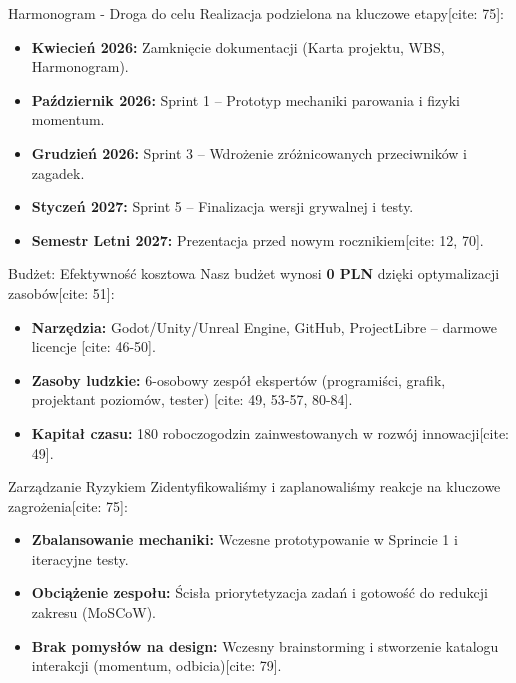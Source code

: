 \documentclass[10pt]{beamer}
\begin{document}
\begin{frame}{Harmonogram - Droga do celu}
    Realizacja podzielona na kluczowe etapy[cite: 75]:
    \begin{itemize}
        \item \textbf{Kwiecień 2026:} Zamknięcie dokumentacji (Karta projektu, WBS, Harmonogram).
        \item \textbf{Październik 2026:} Sprint 1 – Prototyp mechaniki parowania i fizyki momentum.
        \item \textbf{Grudzień 2026:} Sprint 3 – Wdrożenie zróżnicowanych przeciwników i zagadek.
        \item \textbf{Styczeń 2027:} Sprint 5 – Finalizacja wersji grywalnej i testy.
        \item \textbf{Semestr Letni 2027:} Prezentacja przed nowym rocznikiem[cite: 12, 70].
    \end{itemize}
\end{frame}

\begin{frame}{Budżet: Efektywność kosztowa}
    Nasz budżet wynosi \textbf{0 PLN} dzięki optymalizacji zasobów[cite: 51]:
    \begin{itemize}
        \item \textbf{Narzędzia:} Godot/Unity/Unreal Engine, GitHub, ProjectLibre – darmowe licencje [cite: 46-50].
        \item \textbf{Zasoby ludzkie:} 6-osobowy zespół ekspertów (programiści, grafik, projektant poziomów, tester) [cite: 49, 53-57, 80-84].
        \item \textbf{Kapitał czasu:} 180 roboczogodzin zainwestowanych w rozwój innowacji[cite: 49].
    \end{itemize}
\end{frame}

\begin{frame}{Zarządzanie Ryzykiem}
    Zidentyfikowaliśmy i zaplanowaliśmy reakcje na kluczowe zagrożenia[cite: 75]:
    \begin{itemize}
        \item \textbf{Zbalansowanie mechaniki:} Wczesne prototypowanie w Sprincie 1 i iteracyjne testy.
        \item \textbf{Obciążenie zespołu:} Ścisła priorytetyzacja zadań i gotowość do redukcji zakresu (MoSCoW).
        \item \textbf{Brak pomysłów na design:} Wczesny brainstorming i stworzenie katalogu interakcji (momentum, odbicia)[cite: 79].
    \end{itemize}
\end{frame}
\end{document}
